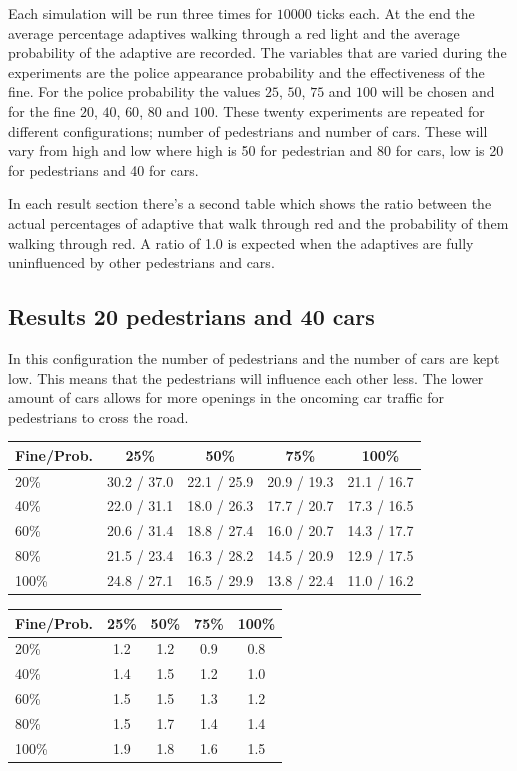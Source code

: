 \documentclass[a4paper]{article}
\begin{document}
Each simulation will be run three times for $10000$ ticks each. At the end the average percentage adaptives walking through a red light and the average probability of the adaptive are recorded. The variables that are varied during the experiments are the police appearance probability and the effectiveness of the fine. For the police probability the values $25$, $50$, $75$ and $100$ will be chosen and for the fine $20$, $40$, $60$, $80$ and $100$. These twenty experiments are repeated for different configurations; number of pedestrians and number of cars. These will vary from high and low where high is 50 for pedestrian and 80 for cars, low is 20 for pedestrians and 40 for cars.

In each result section there's a second table which shows the ratio between the actual percentages of adaptive that walk through red and the probability of them walking through red. A ratio of 1.0 is expected when the adaptives are fully uninfluenced by other pedestrians and cars.

\clearpage
\subsection{Results 20 pedestrians and 40 cars}
In this configuration the number of pedestrians and the number of cars are kept low. This means that the pedestrians will influence each other less. The lower amount of cars allows for more openings in the oncoming car traffic for pedestrians to cross the road.

\begin{table}[H]
\centering
\begin{tabular}{ l | c c c c }
  Fine\slash Prob. & 25\% & 50\% & 75\% & 100\% \\ 
  \hline
  20\%  & 30.2 / 37.0 & 22.1 / 25.9 & 20.9 / 19.3 & 21.1 / 16.7  \\
  40\%  & 22.0 / 31.1 & 18.0 / 26.3 & 17.7 / 20.7 & 17.3 / 16.5  \\
  60\%  & 20.6 / 31.4 & 18.8 / 27.4 & 16.0 / 20.7 & 14.3 / 17.7  \\
  80\%  & 21.5 / 23.4 & 16.3 / 28.2 & 14.5 / 20.9 & 12.9 / 17.5  \\
  100\% & 24.8 / 27.1 & 16.5 / 29.9 & 13.8 / 22.4 & 11.0 / 16.2  \\
\end{tabular}
\end{table}

\begin{table}[H]
\centering
\begin{tabular}{ l | c c c c }
  Fine\slash Prob. & 25\% & 50\% & 75\% & 100\% \\ 
  \hline
  20\%  & 1.2 & 1.2 & 0.9 & 0.8  \\
  40\%  & 1.4 & 1.5 & 1.2 & 1.0  \\
  60\%  & 1.5 & 1.5 & 1.3 & 1.2  \\
  80\%  & 1.5 & 1.7 & 1.4 & 1.4  \\
  100\% & 1.9 & 1.8 & 1.6 & 1.5  \\
\end{tabular}
\end{table}
\end{document}

